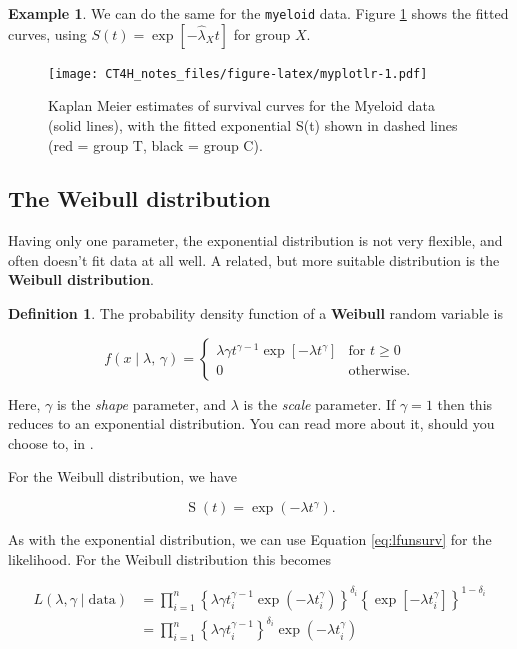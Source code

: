 \documentclass[
  openany]{book}
\theoremstyle{definition}
\newtheorem{definition}{Definition}[chapter]
\theoremstyle{definition}
\newtheorem{example}{Example}[chapter]
\theoremstyle{definition}
\theoremstyle{definition}
\theoremstyle{remark}
\begin{document}
\begin{example}
We can do the same for the \texttt{myeloid} data. Figure \ref{fig:myplotlr} shows the fitted curves, using \(S\left(t\right)=\exp\left[-\hat{\lambda}_Xt\right]\) for group \(X\).

\begin{figure}
\centering
\texttt{[image: CT4H\_notes\_files/figure-latex/myplotlr-1.pdf]}
\caption{\label{fig:myplotlr}Kaplan Meier estimates of survival curves for the Myeloid data (solid lines), with the fitted exponential S(t) shown in dashed lines (red = group T, black = group C).}
\end{figure}

\end{example}

\hypertarget{weibull}{%
\subsection{The Weibull distribution}\label{weibull}}

Having only one parameter, the exponential distribution is not very flexible, and often doesn't fit data at all well. A related, but more suitable distribution is the \textbf{Weibull distribution}.

\begin{definition}
The probability density function of a \textbf{Weibull} random variable is

\[
f\left(x\mid \lambda,\,\gamma\right) = 
\begin{cases}
\lambda\gamma t^{\gamma-1}\exp\left[{-\lambda t^{\gamma}}\right] & \text{for }t\geq{0}\\
0 & \text{otherwise}.
\end{cases}
\]

Here, \(\gamma\) is the \emph{shape} parameter, and \(\lambda\) is the \emph{scale} parameter. If \(\gamma=1\) then this reduces to an exponential distribution. You can read more about it, should you choose to, in \citet{collett_surv}.
\end{definition}

For the Weibull distribution, we have

\[\operatorname{S}\left(t\right) = \exp\left(-\lambda t^{\gamma}\right). \]

As with the exponential distribution, we can use Equation \eqref{eq:lfunsurv} for the likelihood. For the Weibull distribution this becomes

\begin{align*}
L\left(\lambda,\gamma\mid{\text{data}}\right) & = \prod\limits_{i=1}^n\left\lbrace \lambda \gamma t_i^{\gamma-1}\exp\left(-\lambda t_i^{\gamma}\right) \right\rbrace^{\delta_i} \left\lbrace \exp\left[-\lambda t_i^{\gamma}\right] \right\rbrace ^{1-\delta_i}\\
& = \prod\limits_{i=1}^n \left\lbrace \lambda\gamma t_i^{\gamma-1} \right\rbrace^{\delta_i} \exp\left(-\lambda t_i^{\gamma}\right)
\end{align*}
\end{document}
